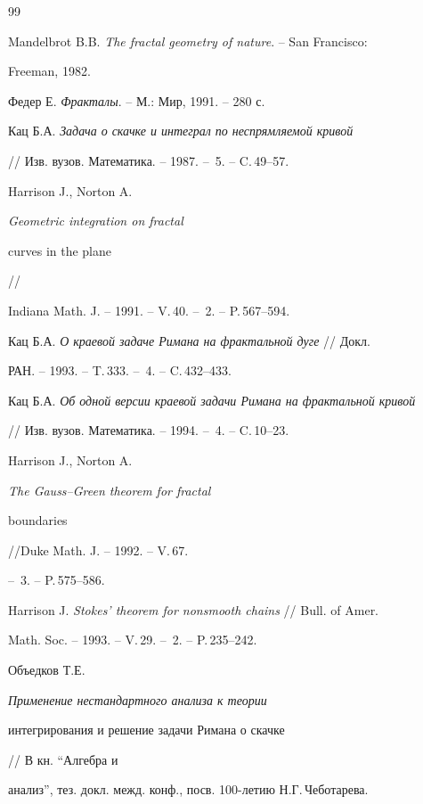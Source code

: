 \begin{thebibliography}{99}







Mandelbrot B.B. {\em The fractal geometry of nature}. -- San Francisco:


Freeman, 1982.




Федер Е. {\em Фракталы}. -- М.: Мир, 1991. -- 280 с.




Кац Б.А. {\em Задача о скачке и интеграл по неспрямляемой кривой}


// Изв. вузов. Математика. -- 1987. -- \No\,5. -- C.\,49--57.




Harrison J., Norton A. {\em Geometric integration on fractal


curves in the plane} //


Indiana Math. J. -- 1991. -- V.\,40. -- \No\,2. -- P.\,567--594.




Кац Б.А. {\em О краевой задаче Римана на фрактальной дуге} // Докл.


РАН. -- 1993. -- T.\,333. -- \No\,4. -- C.\,432--433.




Кац Б.А. {\em Об одной версии краевой задачи Римана на фрактальной кривой}


// Изв. вузов. Математика. -- 1994. -- \No\,4. -- C.\,10--23.




Harrison J., Norton A. {\em The Gauss--Green theorem for fractal


boundaries} //Duke Math. J. -- 1992. -- V.\,67.


-- \No\,3. -- P.\,575--586.




Harrison J. {\em Stokes' theorem for nonsmooth chains} // Bull. of Amer.


Math. Soc. -- 1993. -- V.\,29. -- \No\,2. -- P.\,235--242.




Объедков Т.Е. {\em Применение нестандартного анализа к теории


интегрирования и решение задачи Римана о скачке} // В кн. ``Алгебра и


анализ'', тез. докл. межд. конф., посв. 100-летию Н.Г.\,Чеботарева.



\end{thebibliography}

